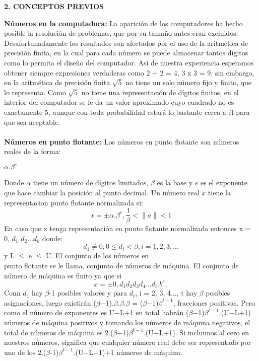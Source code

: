 \documentclass[10pt,a4paper]{article}
\begin{document}
\begin{multicols}{2}
\begin{center}
{\large \bf 2. CONCEPTOS PREVIOS}
\end{center}
\textbf{N\'umeros en la computadora:} 
La aparici\'on de los computadores ha hecho posible la resoluci\'on de problemas, que por su tama\~no antes eran excluidos. Desafortunadamente los resultados son afectados por el uso de la aritm\'etica de precisi\'on finita, en la cual para cada n\'umero se puede almacenar tantos d\'igitos como lo permita el dise\~no del computador. As\'i de nuestra experiencia esperamos obtener siempre expresiones verdaderas como 2 + 2 = 4, 3 x 3 = 9, sin embargo, en la aritm\'etica de precisi\'on finita $\sqrt{5}$ no tiene un solo n\'umero fijo y finito, que lo representa. Como $\sqrt{5}$ no tiene una representaci\'on de d\'igitos finitos, en el interior del computador se le da un valor aproximado cuyo cuadrado no es exactamente 5, aunque con toda probabilidad estar\'a lo bastante cerca a \'el para que sea aceptable.\\\\
\textbf{N\'umeros en punto flotante:}
Los n\'umeros en punto flotante son n\'umeros reales de la forma:
\begin{center}{$\alpha$$.$$\beta^{e}$}
\end{center}
Donde $\alpha$ tiene un n\'umero de d\'igitos limitados, $\beta$ es la base y $e$ es el exponente que hace cambiar la posici\'on al punto decimal. Un n\'umero real $x$ tiene la representacion punto flotante normalizada si:
\begin{equation}
x = \pm {\alpha}.{\beta} ^ {e} ,\frac{1}{\beta}  < \|a\| < { 1 }
\end{equation}
En caso que x tenga representaci\'on en punto flotante normalizada entonces x = 0, $d_1$ $d_2$...$d_k$ donde: 
\begin{equation}
d_1 \neq 0, {0} \leq {d_i} < {\beta}, i = 1, 2, 3,...
\end{equation}
y L $\leq$ e $\leq$ U. El conjunto de los n\'umeros en\\ punto flotante se le llama, conjunto de n\'umeros de m\'aquina. El conjunto de n\'umero de m\'aquina es finito ya que si 
\begin{equation}
x = \pm 0,d_1 d_2 d_3 d_4 ... d_t.b^{e}, 
\end{equation}
Conn $d_1$ hay $\beta$-1 posibles valores y para $d_i$, i = 2, 3, 4..., t hay $\beta$ posibles asignaciones, luego existir\'an ($\beta$$-$1).$\beta$.$\beta$.$\beta$ = ($\beta$$-$1)$\beta^{t-1}$, fracciones positivas. Pero como el n\'umero de exponentes es U$-$L$+$1 en total habr\'an ($\beta$$-$1)$\beta^{t-1}$.(U$-$L$+$1) n\'umeros de m\'aquina positivos y tomando los n\'umeros de m\'aquina negativos, el total de n\'umeros de m\'aquina es $2$.($\beta$$-$1)$\beta^{t-1}$.(U$-$L$+$1). Si incluimos al cero en nuestros n\'umeros, significa que cualquier n\'umero real debe ser representado por uno de los $2$.($\beta$-1)$\beta^{t-1}$.(U$-$L$+$1)$+$1 n\'umeros de m\'aquina.\\\\

\end{multicols}
\end{document}
